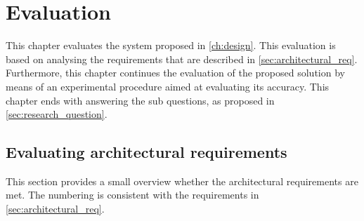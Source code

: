 \chapter{Evaluation}\label{ch:evaluation}
This chapter evaluates the system proposed in \autoref{ch:design}. This evaluation is based on analysing the requirements that are described in \autoref{sec:architectural_req}. Furthermore, this chapter continues the evaluation of the proposed solution by means of an experimental procedure aimed at evaluating its accuracy. This chapter ends with answering the sub questions, as proposed in \autoref{sec:research_question}.

\section{Evaluating architectural requirements}
This section provides a small overview whether the architectural requirements are met. The numbering is consistent with the requirements in \autoref{sec:architectural_req}.

